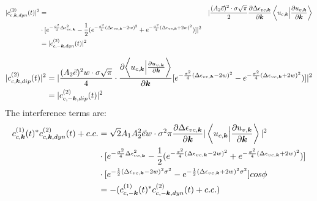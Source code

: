 \begin{equation}
\begin{aligned}
    |c^{(2)}_{c,\boldsymbol k,dyn}(t)|^2&=& \lvert \frac{(A_2 \vec e)^2 \cdot \sigma \sqrt{\pi}}{2}
  \frac{\partial  \Delta \epsilon_{vc,\boldsymbol k}}{\partial \boldsymbol k} \left \langle u_{c,\boldsymbol k}\Big
  |\frac{\partial u_{v,\boldsymbol k}}{\partial \boldsymbol k} \right \rangle\\ 
                                  &    \cdot [e^{-\frac{\sigma^2}{4} \Delta \epsilon_{vc,\boldsymbol k} ^2}-\frac{1}{2}(e^{-\frac{\sigma^2}{4} (\Delta \epsilon_{vc,\boldsymbol k}-2w)^2}+e^{-\frac{\sigma^2}{4} (\Delta \epsilon_{vc,\boldsymbol k}+2w)^2})] \rvert^2\\
    &=|c^{(2)}_{c,-\boldsymbol k,dyn}(t)|^2
\end{aligned}
\end{equation}

\begin{equation}
\begin{aligned}
  |c^{(2)}_{c,\boldsymbol k,dip}(t)|^2&= \lvert \frac{(A_2 \vec e)^2 w \cdot \sigma \sqrt{\pi}}{4} \cdot \frac{\partial{\left \langle u_{c,\boldsymbol k}\Big |\frac{\partial u_{v,\boldsymbol k}}{\partial \boldsymbol k} \right \rangle}}{\partial {\boldsymbol k}}  [e^{-\frac{\sigma^2}{4} (\Delta \epsilon_{vc,\boldsymbol k}-2w)^2}-e^{-\frac{\sigma^2}{4} (\Delta \epsilon_{vc,\boldsymbol k}+2w)^2})] \rvert^2\\
  &=  |c^{(2)}_{c,-\boldsymbol k,dip}(t)|^2
\end{aligned}
\end{equation}
The interference terms are:
\begin{equation}
\begin{aligned}
    c^{(1)}_{c,\boldsymbol k}(t)^* c^{(2)}_{c,\boldsymbol k,dyn}(t) +c.c.&=
   \sqrt{2} A_1 A_2^2 \vec e w \cdot \sigma^2 \pi \frac{\partial  \Delta \epsilon_{vc,\boldsymbol k}}{\partial \boldsymbol k} |\left \langle u_{c,\boldsymbol k}\Big |\frac{\partial u_{v,\boldsymbol k}}{\partial \boldsymbol k} \right \rangle|^2 \\
    &\cdot [e^{-\frac{\sigma^2}{4} \Delta \epsilon_{vc,\boldsymbol k} ^2}-\frac{1}{2}(e^{-\frac{\sigma^2}{4} (\Delta \epsilon_{vc,\boldsymbol k}-2w)^2}+e^{-\frac{\sigma^2}{4} (\Delta \epsilon_{vc,\boldsymbol k}+2w)^2})]\\
    &\cdot[e^{-\frac{1}2{}(\Delta \epsilon_{vc,\boldsymbol k} - 2w)^2 \sigma^2}
    -e^{-\frac{1}{2}(\Delta \epsilon_{vc,\boldsymbol k} + 2w)^2 \sigma^2}
    ]cos\phi\\
    &= -(c^{(1)}_{c,-\boldsymbol k}(t)^* c^{(2)}_{c,-\boldsymbol k,dyn}(t) +c.c.)
\end{aligned}
\end{equation}

